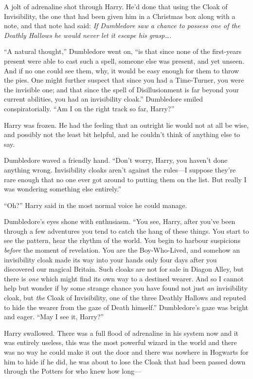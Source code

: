 A jolt of adrenaline shot through Harry. He’d done that using the Cloak of Invisibility, the one that had been given him in a Christmas box along with a note, and that note had said: \emph{If Dumbledore saw a chance to possess one of the Deathly Hallows he would never let it escape his grasp….}

“A natural thought,” Dumbledore went on, “is that since none of the first-years present were able to cast such a spell, someone else was present, and yet unseen. And if no one could see them, why, it would be easy enough for them to throw the pies. One might further suspect that since you had a Time-Turner, you were the invisible one; and that since the spell of Disillusionment is far beyond your current abilities, you had an invisibility cloak.” Dumbledore smiled conspiratorially. “Am I on the right track so far, Harry?”

Harry was frozen. He had the feeling that an outright lie would not at all be wise, and possibly not the least bit helpful, and he couldn’t think of anything else to say.

Dumbledore waved a friendly hand. “Don’t worry, Harry, you haven’t done anything wrong. Invisibility cloaks aren’t against the rules—I suppose they’re rare enough that no one ever got around to putting them on the list. But really I was wondering something else entirely.”

“Oh?” Harry said in the most normal voice he could manage.

Dumbledore’s eyes shone with enthusiasm. “You see, Harry, after you’ve been through a few adventures you tend to catch the hang of these things. You start to see the pattern, hear the rhythm of the world. You begin to harbour suspicions \emph{before} the moment of revelation. You are the Boy-Who-Lived, and somehow an invisibility cloak made its way into your hands only four days after you discovered our magical Britain. Such cloaks are not for sale in Diagon Alley, but there is \emph{one} which might find its own way to a destined wearer. And so I cannot help but wonder if by some strange chance you have found not just \emph{an} invisibility cloak, but \emph{the} Cloak of Invisibility, one of the three Deathly Hallows and reputed to hide the wearer from the gaze of Death himself.” Dumbledore’s gaze was bright and eager. “May I see it, Harry?”

Harry swallowed. There was a full flood of adrenaline in his system now and it was entirely useless, this was the most powerful wizard in the world and there was no way he could make it out the door and there was nowhere in Hogwarts for him to hide if he did, he was about to lose the Cloak that had been passed down through the Potters for who knew how long—

